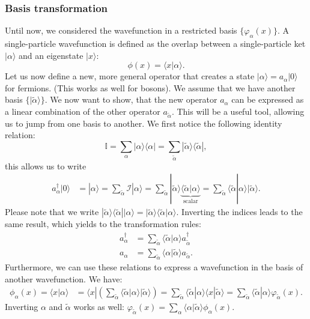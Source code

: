 \documentclass[../main.tex]{subfile}
\begin{document}
\subsubsection{Basis transformation}
Until now, we considered the wavefunction in a restricted basis $\{\varphi_{\alpha}(x)\}$. A single-particle wavefunction
is defined as the overlap between a single-particle ket $|\alpha\rangle$ and an eigenstate $|x\rangle$:
\[
    \phi(x) = \langle x | \alpha \rangle.
\]
Let us now define a new, more general operator that creates a state $|\alpha\rangle = a_{\alpha}|0\rangle$ for fermions. (This works as well for bosons).
We assume that we have another basis $\{|\tilde{\alpha}\rangle\}$.
We now want to show, that the new operator $a_{\alpha}$ can be expressed as a linear combination of the other operator  $a_{\tilde{\alpha}}$. This will be a
useful tool, allowing us to jump from one basis to another. We first notice the following identity relation:
\[
    \mathbb{I} = \sum_{\alpha} | \alpha \rangle \langle \alpha| = \sum_{\tilde{\alpha}} | \tilde{\alpha} \rangle \langle \tilde{\alpha}|,
\]
this allows us to write 
\begin{align*}  
    a_{\alpha}^{\dagger}|0\rangle &= | \alpha \rangle =  \sum_{\tilde{\alpha}}\mathcal{I}|\alpha\rangle 
    =\sum_{\tilde{\alpha}}|\tilde{\alpha}\rangle\underbrace{\langle\tilde{\alpha}|\alpha\rangle}_{\text{scalar}} 
    = \sum_{\tilde{\alpha}}\langle\tilde{\alpha}|\alpha\rangle |\tilde{\alpha}\rangle.
\end{align*}
Please note that we write $|\tilde{\alpha}\rangle\langle\tilde{\alpha}||\alpha\rangle = |\tilde{\alpha}\rangle\langle\tilde{\alpha}|\alpha\rangle$.
Inverting the indices leads to the same result, which yields to the transformation rules:
\begin{align*}
    a_{\alpha}^{\dagger} &= \sum_{\tilde{\alpha}}\langle\tilde{\alpha}|\alpha\rangle a_{\tilde{\alpha}}^{\dagger}\\
    a_{\alpha} &= \sum_{\tilde{\alpha}}\langle\alpha|\tilde{\alpha}\rangle a_{\tilde{\alpha}}.
\end{align*}
Furthermore, we can use these relations to express a wavefunction in the basis of another wavefunction. We have:
\begin{align*}
    \phi_{\alpha}(x) = \langle x|\alpha\rangle &= \langle x|\left(\sum_{\tilde{\alpha}} \langle \tilde{\alpha}|\alpha\rangle |\tilde{\alpha}\rangle\right) = \sum_{\tilde{\alpha}}  \langle \tilde{\alpha}|\alpha\rangle\langle x|\tilde{\alpha}\rangle
    = \sum_{\tilde{\alpha}} \langle \tilde{\alpha}|\alpha\rangle \varphi_{\tilde{\alpha}}(x).
\end{align*}
Inverting $\alpha$ and $\tilde{\alpha}$ works as well: $\varphi_{\tilde{\alpha}}(x) = \sum_{\alpha} \langle \alpha|\tilde{\alpha}\rangle \phi_{\alpha}(x)$.\\
\end{document}
